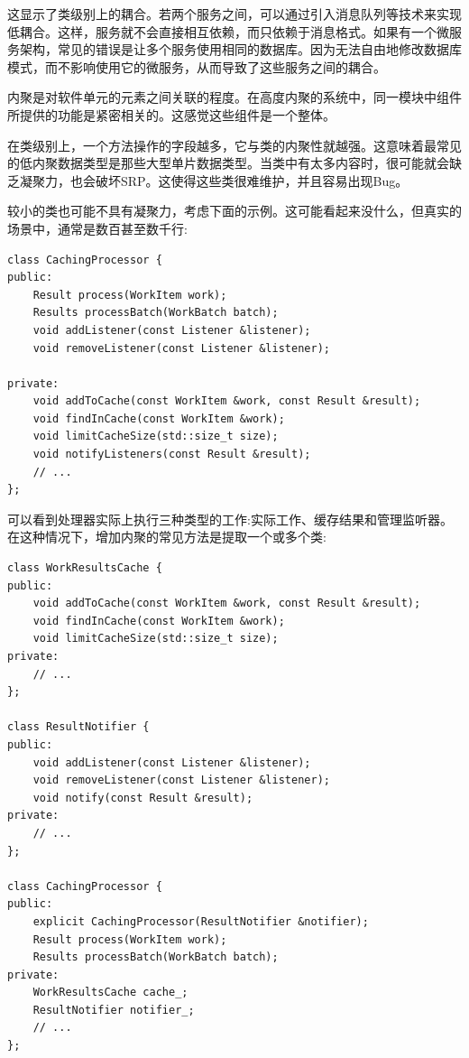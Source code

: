 这显示了类级别上的耦合。若两个服务之间，可以通过引入消息队列等技术来实现低耦合。这样，服务就不会直接相互依赖，而只依赖于消息格式。如果有一个微服务架构，常见的错误是让多个服务使用相同的数据库。因为无法自由地修改数据库模式，而不影响使用它的微服务，从而导致了这些服务之间的耦合。


内聚是对软件单元的元素之间关联的程度。在高度内聚的系统中，同一模块中组件所提供的功能是紧密相关的。这感觉这些组件是一个整体。

在类级别上，一个方法操作的字段越多，它与类的内聚性就越强。这意味着最常见的低内聚数据类型是那些大型单片数据类型。当类中有太多内容时，很可能就会缺乏凝聚力，也会破坏SRP。这使得这些类很难维护，并且容易出现Bug。

较小的类也可能不具有凝聚力，考虑下面的示例。这可能看起来没什么，但真实的场景中，通常是数百甚至数千行:

\begin{lstlisting}[style=styleCXX]
class CachingProcessor {
public:
	Result process(WorkItem work);
	Results processBatch(WorkBatch batch);
	void addListener(const Listener &listener);
	void removeListener(const Listener &listener);
	
private:
	void addToCache(const WorkItem &work, const Result &result);
	void findInCache(const WorkItem &work);
	void limitCacheSize(std::size_t size);
	void notifyListeners(const Result &result);
	// ...
};
\end{lstlisting}

可以看到处理器实际上执行三种类型的工作:实际工作、缓存结果和管理监听器。在这种情况下，增加内聚的常见方法是提取一个或多个类:

\begin{lstlisting}[style=styleCXX]
class WorkResultsCache {
public:
	void addToCache(const WorkItem &work, const Result &result);
	void findInCache(const WorkItem &work);
	void limitCacheSize(std::size_t size);
private:
	// ...
};

class ResultNotifier {
public:
	void addListener(const Listener &listener);
	void removeListener(const Listener &listener);
	void notify(const Result &result);
private:
	// ...
};

class CachingProcessor {
public:
	explicit CachingProcessor(ResultNotifier &notifier);
	Result process(WorkItem work);
	Results processBatch(WorkBatch batch);
private:
	WorkResultsCache cache_;
	ResultNotifier notifier_;
	// ...
};
\end{lstlisting}


